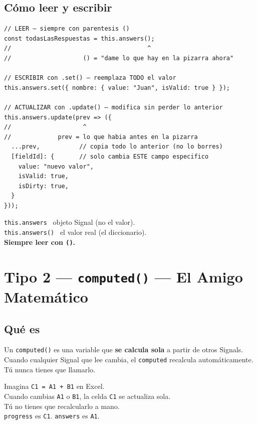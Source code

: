 \documentclass[12pt, a4paper]{article}
\begin{document}
\subsection{ Cómo leer y escribir}

\begin{lstlisting}
// LEER — siempre con parentesis ()
const todasLasRespuestas = this.answers();
//                                      ^
//                    () = "dame lo que hay en la pizarra ahora"

// ESCRIBIR con .set() — reemplaza TODO el valor
this.answers.set({ nombre: { value: "Juan", isValid: true } });

// ACTUALIZAR con .update() — modifica sin perder lo anterior
this.answers.update(prev => ({
//                    ^
//             prev = lo que habia antes en la pizarra
  ...prev,           // copia todo lo anterior (no lo borres)
  [fieldId]: {       // solo cambia ESTE campo especifico
    value: "nuevo valor",
    isValid: true,
    isDirty: true,
  }
}));
\end{lstlisting}

\begin{tcolorbox}[regla, title={\emoji{pushpin} Regla de Oro}]
  \texttt{this.answers} \textrightarrow\ objeto Signal (no el valor).\\
  \texttt{this.answers()} \textrightarrow\ el valor real (el diccionario).\\[0.2cm]
  \textbf{Siempre leer con \texttt{()}.}
\end{tcolorbox}

\section{ Tipo 2 — \texttt{computed()} — El Amigo Matemático}

\subsection{Qué es}

Un \texttt{computed()} es una variable que \textbf{se calcula sola} a partir de
otros Signals. Cuando cualquier Signal que lee cambia, el \texttt{computed}
recalcula automáticamente. Tú nunca tienes que llamarlo.

\begin{tcolorbox}[analogia, title={\emoji{memo} Celda de Excel con Fórmula}]
  Imagina \texttt{C1 = A1 + B1} en Excel.\\
  Cuando cambias \texttt{A1} o \texttt{B1}, la celda \texttt{C1} se actualiza sola.\\
  Tú no tienes que recalcularlo a mano.\\[0.3cm]
   \texttt{progress} es \texttt{C1}. \quad \texttt{answers} es \texttt{A1}.
\end{tcolorbox}
\end{document}
